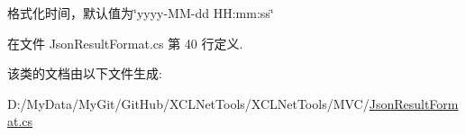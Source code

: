 格式化时间，默认值为\char`\"{}yyyy-\/\-M\-M-\/dd H\-H\-:mm\-:ss\char`\"{} 



在文件 Json\-Result\-Format.\-cs 第 40 行定义.



该类的文档由以下文件生成\-:\begin{DoxyCompactItemize}
\item 
D\-:/\-My\-Data/\-My\-Git/\-Git\-Hub/\-X\-C\-L\-Net\-Tools/\-X\-C\-L\-Net\-Tools/\-M\-V\-C/\hyperlink{_json_result_format_8cs}{Json\-Result\-Format.\-cs}\end{DoxyCompactItemize}
